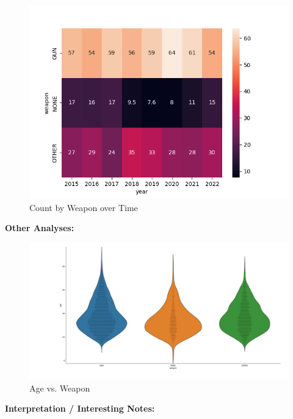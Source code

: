 \documentclass[12pt]{article}
\begin{document}
\begin{enumerate}[leftmargin=\labelsep]
  \begin{figure}[htb]
    \begin{center}
      \includegraphics[width=\textwidth]{media/Count_by_Weapon_over_Time.png}
    \end{center}
    \caption{Count by Weapon over Time}
    \label{fig:p2_count_by_weapon_time}
  \end{figure}
  
  \textbf{Other Analyses:}

  \begin{figure}[htb]
    \begin{center}
      \includegraphics[width=\textwidth]{media/p2_age_vs_weapon.png}
    \end{center}
    \caption{Age vs. Weapon}
    \label{fig:p2_age_vs_weapon}
  \end{figure}
  
  \textbf{Interpretation / Interesting Notes:}
  
\end{enumerate}
\end{document}
